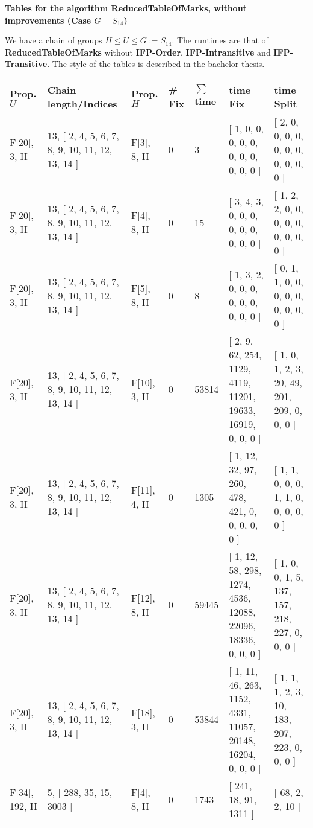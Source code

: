 \documentclass[9 pt]{scrartcl}
\begin{document}
\begin{center}

\textbf{\LARGE Tables for the algorithm ReducedTableOfMarks, without improvements (Case $G=S_{14}$)} 

\end{center}
We have a chain of groups $H \leq U \leq G:=S_{14}$. The runtimes are that of \textbf{ReducedTableOfMarks} without \textbf{IFP-Order}, \textbf{IFP-Intransitive} and \textbf{IFP-Transitive}. The style of the tables is described in the bachelor thesis.
\begin{longtable}{ |p{3em}|p{6em}|p{3em}|p{2em}|p{2em}|p{6em}|p{6em}| }\hline 
    Prop. $U$ & Chain length/Indices & Prop. $H$ & \# Fix & $\sum$ time & time Fix& time Split   \\ \hline

F[20], 3, II &13, [ 2, 4, 5, 6, 7, 8, 9, 10, 11, 12, 13, 14 ] & F[3], 8, II  & 0 & 3 & [ 1, 0, 0, 0, 0, 0, 0, 0, 0, 0, 0, 0 ] & [ 2, 0, 0, 0, 0, 0, 0, 0, 0, 0, 0, 0 ]\\ \hline
F[20], 3, II &13, [ 2, 4, 5, 6, 7, 8, 9, 10, 11, 12, 13, 14 ] & F[4], 8, II  & 0 & 15 & [ 3, 4, 3, 0, 0, 0, 0, 0, 0, 0, 0, 0 ] & [ 1, 2, 2, 0, 0, 0, 0, 0, 0, 0, 0, 0 ]\\ \hline
F[20], 3, II &13, [ 2, 4, 5, 6, 7, 8, 9, 10, 11, 12, 13, 14 ] & F[5], 8, II  & 0 & 8 & [ 1, 3, 2, 0, 0, 0, 0, 0, 0, 0, 0, 0 ] & [ 0, 1, 1, 0, 0, 0, 0, 0, 0, 0, 0, 0 ]\\ \hline
F[20], 3, II &13, [ 2, 4, 5, 6, 7, 8, 9, 10, 11, 12, 13, 14 ] & F[10], 3, II  & 0 & 53814 & [ 2, 9, 62, 254, 1129, 4119, 11201, 19633, 16919, 0, 0, 0 ] & [ 1, 0, 1, 2, 3, 20, 49, 201, 209, 0, 0, 0 ]\\ \hline
F[20], 3, II &13, [ 2, 4, 5, 6, 7, 8, 9, 10, 11, 12, 13, 14 ] & F[11], 4, II  & 0 & 1305 & [ 1, 12, 32, 97, 260, 478, 421, 0, 0, 0, 0, 0 ] & [ 1, 1, 0, 0, 0, 1, 1, 0, 0, 0, 0, 0 ]\\ \hline
F[20], 3, II &13, [ 2, 4, 5, 6, 7, 8, 9, 10, 11, 12, 13, 14 ] & F[12], 8, II  & 0 & 59445 & [ 1, 12, 58, 298, 1274, 4536, 12088, 22096, 18336, 0, 0, 0 ] & [ 1, 0, 0, 1, 5, 137, 157, 218, 227, 0, 0, 0 ]\\ \hline
F[20], 3, II &13, [ 2, 4, 5, 6, 7, 8, 9, 10, 11, 12, 13, 14 ] & F[18], 3, II  & 0 & 53844 & [ 1, 11, 46, 263, 1152, 4331, 11057, 20148, 16204, 0, 0, 0 ] & [ 1, 1, 1, 2, 3, 10, 183, 207, 223, 0, 0, 0 ]\\ \hline
F[34], 192, II &5, [ 288, 35, 15, 3003 ] & F[4], 8, II  & 0 & 1743 & [ 241, 18, 91, 1311 ] & [ 68, 2, 2, 10 ]\\ \hline

\end{longtable}
\end{document}
